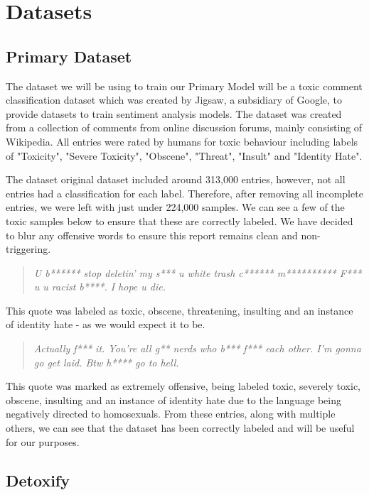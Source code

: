 \chapter{Datasets}

\section{Primary Dataset}
\label{sec:JigsawDataset}

The dataset we will be using to train our Primary Model will be a toxic comment classification dataset which was created by Jigsaw, a subsidiary of Google, to provide datasets to train sentiment analysis models. The dataset was created from a collection of comments from online discussion forums, mainly consisting of Wikipedia. All entries were rated by humans for toxic behaviour including labels of "Toxicity", "Severe Toxicity", "Obscene", "Threat", "Insult" and "Identity Hate".

The dataset original dataset included around 313,000 entries, however, not all entries had a classification for each label. Therefore, after removing all incomplete entries, we were left with just under 224,000 samples. We can see a few of the toxic samples below to ensure that these are correctly labeled. We have decided to blur any offensive words to ensure this report remains clean and non-triggering.

\begin{quote}
    \textit{U b****** stop deletin' my s*** u white trash c****** m********** F*** u u racist b****. I hope u die.}
\end{quote}

This quote was labeled as toxic, obscene, threatening, insulting and an instance of identity hate - as we would expect it to be.

\begin{quote}
    \textit{Actually f*** it. You're all g** nerds who b*** f*** each other. I'm gonna go get laid. Btw h**** go to hell.}
\end{quote}

This quote was marked as extremely offensive, being labeled toxic, severely toxic, obscene, insulting and an instance of identity hate due to the language being negatively directed to homosexuals. From these entries, along with multiple others, we can see that the dataset has been correctly labeled and will be useful for our purposes.

\section{Detoxify}
\label{sec:Detoxify}

